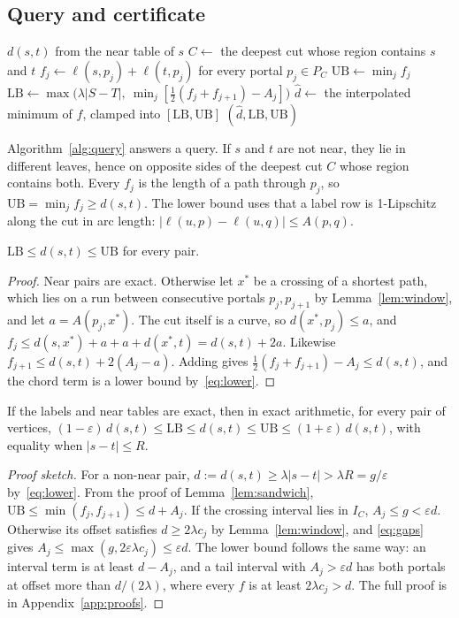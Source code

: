 \documentclass[sigconf,nonacm,screen]{acmart}
\newcommand{\LB}{\mathrm{LB}}
\newcommand{\UB}{\mathrm{UB}}
\newcommand{\eps}{\varepsilon}
\begin{document}
\subsection{Query and certificate}

\begin{algorithm}[t]
\caption{Query $(s,t)$}
\label{alg:query}
\begin{algorithmic}[1]
 \Return $d(s,t)$ from the near table of $s$ \EndIf
\State $C\gets$ the deepest cut whose region contains $s$ and $t$
\State $f_j\gets\ell(s,p_j)+\ell(t,p_j)$ for every portal $p_j\in P_C$
\State $\UB\gets\min_j f_j$
\State $\LB\gets\max\big(\lambda|S-T|,\ \min_j[\tfrac12(f_j+f_{j+1})-A_j]\big)$ 
\State $\hat d\gets$ the interpolated minimum of $f$, clamped into $[\LB,\UB]$
\State \Return $(\hat d,\LB,\UB)$
\end{algorithmic}
\end{algorithm}

Algorithm~\ref{alg:query} answers a query. If $s$ and $t$ are not near, they lie in different leaves, hence on
opposite sides of the deepest cut $C$ whose region contains both. Every $f_j$ is the length of a path through
$p_j$, so $\UB=\min_j f_j\ge d(s,t)$. The lower bound uses that a label row is 1-Lipschitz along the cut in
arc length: $|\ell(u,p)-\ell(u,q)|\le A(p,q)$.

\begin{lemma}[sandwich]
\label{lem:sandwich}
$\LB\le d(s,t)\le\UB$ for every pair.
\end{lemma}
\begin{proof}
Near pairs are exact. Otherwise let $x^\ast$ be a crossing of a shortest path, which lies on a run between
consecutive portals $p_j,p_{j+1}$ by Lemma~\ref{lem:window}, and let $a=A(p_j,x^\ast)$. The cut itself is a
curve, so $d(x^\ast,p_j)\le a$, and
$f_j\le d(s,x^\ast)+a+a+d(x^\ast,t)=d(s,t)+2a$. Likewise $f_{j+1}\le d(s,t)+2(A_j-a)$. Adding gives
$\frac12(f_j+f_{j+1})-A_j\le d(s,t)$, and the chord term is a lower bound by~\eqref{eq:lower}.
\end{proof}

\begin{theorem}
\label{thm:main}
If the labels and near tables are exact, then in exact arithmetic, for every pair of vertices,
$(1-\eps)\,d(s,t)\le\LB\le d(s,t)\le\UB\le(1+\eps)\,d(s,t)$,
with equality when $|s-t|\le R$.
\end{theorem}
\begin{proof}[Proof sketch]
For a non-near pair, $d:=d(s,t)\ge\lambda|s-t|>\lambda R=g/\eps$ by~\eqref{eq:lower}. From the proof of
Lemma~\ref{lem:sandwich}, $\UB\le\min(f_j,f_{j+1})\le d+A_j$. If the crossing interval lies in $I_C$,
$A_j\le g<\eps d$. Otherwise its offset satisfies $d\ge 2\lambda c_j$ by Lemma~\ref{lem:window}, and
\eqref{eq:gaps} gives $A_j\le\max(g,2\eps\lambda c_j)\le\eps d$. The lower bound follows the same way: an
interval term is at least $d-A_j$, and a tail interval with $A_j>\eps d$ has both portals at offset more than
$d/(2\lambda)$, where every $f$ is at least $2\lambda c_j>d$. The full proof is in Appendix~\ref{app:proofs}.
\end{proof}
\end{document}
